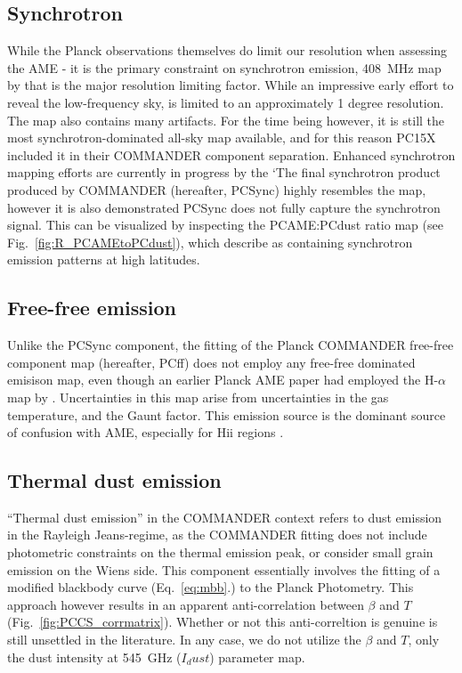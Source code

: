        \subsection{Synchrotron}
        While the Planck observations themselves do limit our resolution when assessing the AME - it is the primary constraint on synchrotron emission, 408~MHz map by \cite{haslam82} that is the major resolution limiting factor. While an impressive early effort to reveal the low-frequency sky, \citep{haslam82} is limited to an approximately 1 degree resolution. The map also contains many artifacts. For the time being however, it is still the most synchrotron-dominated all-sky map available, and for this reason PC15X included it in their COMMANDER component separation. Enhanced synchrotron mapping efforts are currently in progress by the `The final synchrotron product produced by COMMANDER (hereafter, PCSync) highly resembles the \citep{haslam82} map, however it is also demonstrated PCSync does not fully capture the synchrotron signal. This can be visualized by inspecting the PCAME:PCdust ratio map (see Fig.~\ref{fig:R_PCAMEtoPCdust}), which \cite{hensley16} describe as containing synchrotron emission patterns at high latitudes.


       \subsection{Free-free emission}
        Unlike the PCSync component, the fitting of the Planck COMMANDER free-free component map (hereafter, PCff) does not employ any free-free dominated emisison map, even though an earlier Planck AME paper \citep{planckXV} had employed the H-$\alpha$ map by \cite{wham98}. Uncertainties in this map arise from uncertainties in the gas temperature, and the Gaunt factor. This emission source is the dominant source of confusion with AME, especially for Hii regions \citep{planckXV,planckXII, paladini15}.

      \subsection{Thermal dust emission}
      ``Thermal dust emission'' in the COMMANDER context refers to dust emission in the Rayleigh Jeans-regime, as the COMMANDER fitting does not include photometric constraints on the thermal emission peak, or consider small grain emission on the Wiens side. This component essentially involves the fitting of a modified blackbody curve (Eq.~\ref{eq:mbb}.) to the Planck Photometry. This approach however results in an apparent anti-correlation between $\beta$ and $T$ (Fig.~\ref{fig:PCCS_corrmatrix}). Whether or not this anti-correltion is genuine is still unsettled in the literature. In any case, we do not utilize the $\beta$ and $T$, only the dust intensity at 545~GHz ($I_dust$) parameter map.

